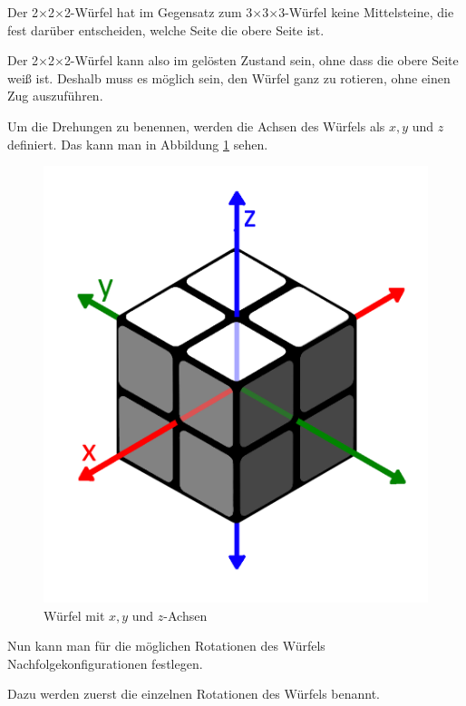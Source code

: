 \documentclass[12pt,a4paper, usenames, dvipsnames]{article}
\newcommand{\Ttwo}{2$\times$2$\times$2-}
\newcommand{\Tthree}{3$\times$3$\times$3-}
\begin{document}
Der \Ttwo Würfel hat im Gegensatz zum \Tthree Würfel keine Mittelsteine, die fest darüber entscheiden, welche Seite die obere Seite ist. 

Der \Ttwo Würfel kann also im gelösten Zustand sein, ohne dass die obere Seite weiß ist. Deshalb muss es möglich sein, den Würfel ganz zu rotieren, ohne einen Zug auszuführen.

Um die Drehungen zu benennen, werden die Achsen des Würfels als $x, y$ und $z$ definiert. Das kann man in Abbildung \ref{15} sehen.
\begin{figure}[h]
\centering
\includegraphics[scale=0.13]{Pfeile.png}
\caption[Würfel mit $x, y$ und $z$-Achsen]{Würfel mit $x, y$ und $z$-Achsen}
\label{15}
\end{figure} 

Nun kann man für die möglichen Rotationen des Würfels Nachfolgekonfigurationen festlegen. 

Dazu werden zuerst die einzelnen Rotationen des Würfels benannt. 
\end{document}
